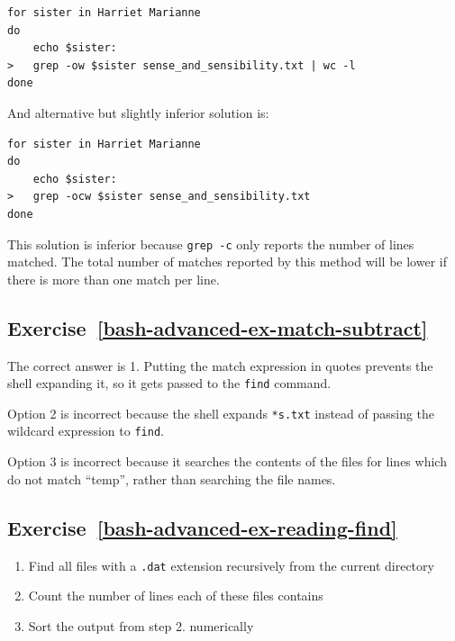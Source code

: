 \documentclass[
]{krantz}
\providecommand{\tightlist}{%
  \setlength{\itemsep}{0pt}\setlength{\parskip}{0pt}}
\begin{document}
\begin{verbatim}
for sister in Harriet Marianne
do
    echo $sister:
>   grep -ow $sister sense_and_sensibility.txt | wc -l
done
\end{verbatim}

And alternative but slightly inferior solution is:

\begin{verbatim}
for sister in Harriet Marianne
do
    echo $sister:
>   grep -ocw $sister sense_and_sensibility.txt
done
\end{verbatim}

This solution is inferior because \texttt{grep\ -c} only reports the number of lines matched.
The total number of matches reported by this method
will be lower if there is more than one match per line.

\hypertarget{exercise-refbash-advanced-ex-match-subtract}{%
\subsection*{Exercise~\ref{bash-advanced-ex-match-subtract}}\label{exercise-refbash-advanced-ex-match-subtract}}


The correct answer is 1. Putting the match expression in quotes prevents the shell
expanding it, so it gets passed to the \texttt{find} command.

Option 2 is incorrect because the shell expands \texttt{*s.txt} instead of passing the wildcard
expression to \texttt{find}.

Option 3 is incorrect because it searches the contents of the files for lines which
do not match ``temp'', rather than searching the file names.

\hypertarget{exercise-refbash-advanced-ex-reading-find}{%
\subsection*{Exercise~\ref{bash-advanced-ex-reading-find}}\label{exercise-refbash-advanced-ex-reading-find}}


\begin{enumerate}
\def\labelenumi{\arabic{enumi}.}
\tightlist
\item
  Find all files with a \texttt{.dat} extension recursively from the current directory
\item
  Count the number of lines each of these files contains
\item
  Sort the output from step 2. numerically
\end{enumerate}
\end{document}
